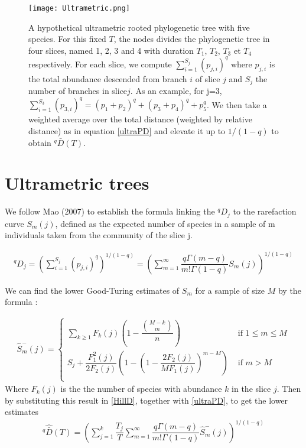 \documentclass{article}
\begin{document}
 \begin{figure}[H]
	  \centering
  	\texttt{[image: Ultrametric.png]}
  	\caption{A hypothetical ultrametric rooted phylogenetic tree with five species. 
  	For this fixed $T$, the nodes divides the phylogenetic tree in four slices,
  	 named 1, 2, 3 and 4 with duration $T_1$, $T_2$, $T_3$ et $T_4$ respectively.
 	For each slice, we compute $\sum_{i=1}^{S_j} (p_{j,i})^q$ where $p_{j,i}$ is the total abundance descended from branch $i$ of slice $j$ and $S_j$ the number of branches in slice$j$. As an example, for j=3, $\sum_{i=1}^{S_3} (p_{3,i})^q=(p_1+p_2)^q+(p_3+p_4)^q+p_5^q$. We  then take a weighted average over the total distance (weighted by relative distance) as in equation \eqref{ultraPD} and elevate it up to $1/(1-q)$ to obtain $^q \bar{D} (T)$. 	
  	}
	\end{figure}
	
	
\section{Ultrametric trees} 

We follow Mao (2007) to establish the formula linking the $^q D_j$ to the rarefaction curve $S_m(j)$, defined as the expected number of species in a sample of m individuals taken from the community of the slice j. 

\begin{align} \label{HillD}
 ^q D_j=\left( \sum_{i=1}^{S_j} (p_{j,i})^q \right)^{1/(1-q)}=\left( \sum_{m=1}^{\infty} \dfrac{q \Gamma (m-q)}{m!\Gamma (1-q)} S_m(j) \right)^{1/(1-q)}
 \end{align}

We can find the lower Good-Turing estimates of $S_m$ for a sample of size $M$ by the formula :

\begin{align}
 \widehat{S}^-_m(j)=\left\{ 
\begin{array}{ll}
      \sum_{k \geq 1} F_k(j)\left( 1- \dfrac{\binom{M-k}{m}}{n}\right) & \text{ if } 1\leq m \leq M \\
	  S_j +\dfrac{F_1^2(j)}{2 F_2(j)} \left( 1- \left(1-\dfrac{2 F_2(j)}{M F_1(j)} \right)^{m-M}\right)	& \text{ if } m > M \\ 
    \end{array} 
 \right.
 \end{align} 
Where $F_k(j)$ is the the number of species with abundance $k$ in the slice $j$. 
Then by substituting this result  in  \eqref{HillD}, together with \eqref{ultraPD}, to get the lower estimates 
\begin{align} \label{D+}
 ^q \widehat{\bar{D}}(T) =\left( \sum_{j=1}^k \dfrac{T_j}{T} \sum_{m=1}^{\infty} \dfrac{q \Gamma (m-q)}{m!\Gamma (1-q)} \widehat{S}_m^-(j) \right)^{1/(1-q)}
 \end{align}
\end{document}
